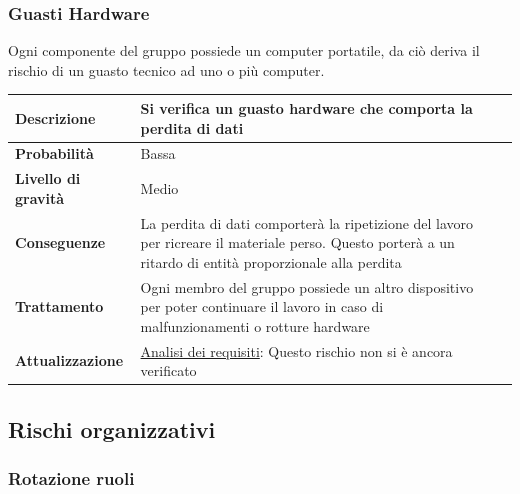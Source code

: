 \subsubsection{Guasti Hardware}
Ogni componente del gruppo possiede un computer portatile, da ciò deriva il rischio di un guasto tecnico ad uno o più computer.

\begin{center}
	
	\begin{tabular}{|>{\centering}m{4cm} ||>{\centering}m{8cm} |>{\centering\arraybackslash}m{0pt}@{}|}
		\hline
		\textbf{Descrizione} & Si verifica un guasto hardware che comporta la perdita di dati & \\[2ex]
		\hline	
		\textbf{Probabilità} & Bassa &\\[1ex]
		\hline
		\textbf{Livello di gravità} & Medio & \\[1ex]
		\hline
		\textbf{Conseguenze} & La perdita di dati comporterà la ripetizione del lavoro per ricreare il materiale perso. Questo porterà a un ritardo di entità proporzionale alla perdita & \\[1ex]
		\hline
		\textbf{Trattamento} & Ogni membro del gruppo possiede un altro dispositivo per poter continuare il lavoro in caso di malfunzionamenti o rotture hardware & \\[1ex] 
		\hline
		\textbf{Attualizzazione} & \underline{Analisi dei requisiti}: Questo rischio non si è ancora verificato & \\[1ex]
		\hline
	\end{tabular}
	
\end{center}


\subsection{Rischi organizzativi}
\subsubsection{Rotazione ruoli}

